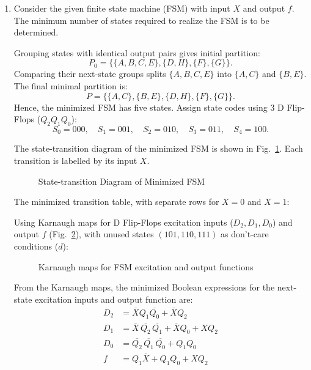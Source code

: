 \begin{enumerate}[label=\thesubsection.\arabic*, ref=\thesubsection.\theenumi]
\item Consider the given finite state machine (FSM) with input $X$ and output $f$. The minimum number of states required to realize the FSM is to be determined.

\begin{center}

\end{center}

\solution

Grouping states with identical output pairs gives initial partition:
\[
P_0=\{\{A,B,C,E\},\{D,H\},\{F\},\{G\}\}.
\]
Comparing their next-state groups splits $\{A,B,C,E\}$ into $\{A,C\}$ and $\{B,E\}$. The final minimal partition is:
\[
P=\{\{A,C\},\{B,E\},\{D,H\},\{F\},\{G\}\}.
\]
Hence, the minimized FSM has five states. Assign state codes using 3 D Flip-Flops ($Q_2Q_1Q_0$):
\[
S_0=000, \quad S_1=001, \quad S_2=010, \quad S_3=011, \quad S_4=100.
\]

The state-transition diagram of the minimized FSM is shown in Fig.~\ref{fig:q22_fsm_diagram}. Each transition is labelled by its input $X$.

\begin{figure}[H]
    \centering
    
    \caption{State-transition Diagram of Minimized FSM}
    \label{fig:q22_fsm_diagram}
\end{figure}

The minimized transition table, with separate rows for $X=0$ and $X=1$:

\begin{center}

\end{center}

Using Karnaugh maps for D Flip-Flops excitation inputs ($D_2, D_1, D_0$) and output $f$ (Fig.~\ref{fig:q22_kmap}), with unused states $(101, 110, 111)$ as don't-care conditions ($d$):

\begin{figure}[H]
    \centering
    
    \caption{Karnaugh maps for FSM excitation and output functions}
    \label{fig:q22_kmap}
\end{figure}

From the Karnaugh maps, the minimized Boolean expressions for the next-state excitation inputs and output function are:
\begin{align}
D_2 &= \overline{X} Q_1 \overline{Q_0} + \overline{X} Q_2 \label{eq:D2_expr} \\
D_1 &= \overline{X} \,\overline{Q_2}\,\overline{Q_1} + \overline{X} Q_0 + X Q_2 \label{eq:D1_expr} \\
D_0 &= \overline{Q_2}\,\overline{Q_1}\,\overline{Q_0} + Q_1 Q_0 \label{eq:D0_expr} \\
f   &= Q_1 \overline{X} + Q_1 Q_0 + X Q_2 \label{eq:f_expr}
\end{align}


\end{enumerate}
